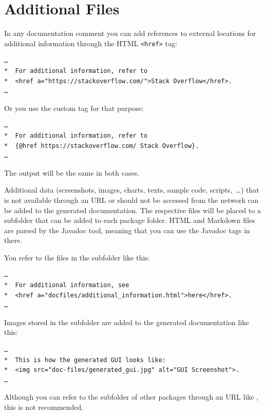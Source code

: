 \section{Additional Files}\label{sec:AdditionalFiles}
In any documentation comment you can add references to external locations for additional information through the HTML \lstinline|<href>| tag:
\begin{lstlisting}[language=Comment]
…
*  For additional information, refer to 
*  <href a="https://stackoverflow.com/">Stack Overflow</href>.
…  
\end{lstlisting}

Or you use the custom tag  for that purpose:
\begin{lstlisting}[language=Comment]
…
*  For additional information, refer to 
*  {@href https://stackoverflow.com/ Stack Overflow}.
…  
\end{lstlisting}
The output will be the same in both cases.

Additional data (screenshots, images, charts, texts, sample code, scripts,~…) that is not available through an URL or should not be accessed from the network can be added to the generated documentation. The respective files will be placed to a \mbox{} subfolder that can be added to each package folder. HTML and Markdown files are parsed by the Javadoc tool, meaning that you can use the Javadoc tags in there.

You refer to the files in the \mbox{} subfolder like this:
\begin{lstlisting}[language=Comment]
…
*  For additional information, see 
*  <href a="docfiles/additional_information.html">here</href>.
…  
\end{lstlisting}

Images stored in the \mbox{} subfolder are added to the generated documentation like this:
\begin{lstlisting}[language=Comment]
…
*  This is how the generated GUI looks like: 
*  <img src="doc-files/generated_gui.jpg" alt="GUI Screenshot">.
…  
\end{lstlisting}

Although you can refer to the \mbox{} subfolder of other packages through an URL like \mbox{}, this is not recommended.


